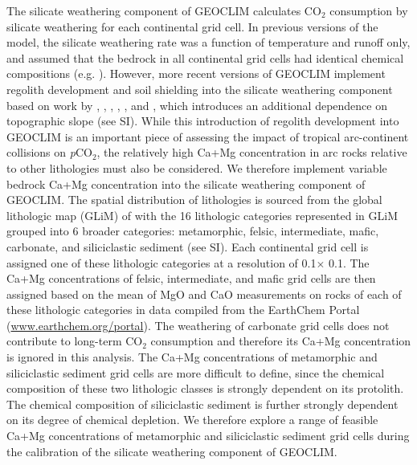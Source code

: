 \documentclass[11pt,letterpaper]{article}
\newcommand{\degrees}{\textdegree\xspace}
\newcommand{\pCOtwo}{\textit{p}CO$_{2}$\xspace}
\newcommand{\COtwo}{CO$_{2}$\xspace}
\begin{document}
The silicate weathering component of GEOCLIM calculates \COtwo consumption by silicate weathering for each continental grid cell. In previous versions of the model, the silicate weathering rate was a function of temperature and runoff only, and assumed that the bedrock in all continental grid cells had identical chemical compositions (e.g. \citealp{Godderis2014a}). However, more recent versions of GEOCLIM implement regolith development and soil shielding into the silicate weathering component based on work by \citet{Heimsath1997a}, \citet{Gabet2009a}, \citet{West2012a}, \citet{Carretier2014a}, \citet{Godderis2017b}, and \citet{Maffre2018a}, which introduces an additional dependence on topographic slope (see SI). While this introduction of regolith development into GEOCLIM is an important piece of assessing the impact of tropical arc-continent collisions on \pCOtwo, the relatively high Ca+Mg concentration in arc rocks relative to other lithologies must also be considered. We therefore implement variable bedrock Ca+Mg concentration into the silicate weathering component of GEOCLIM. The spatial distribution of lithologies is sourced from the global lithologic map (GLiM) of \citet{Hartmann2012a} with the 16 lithologic categories represented in GLiM grouped into 6 broader categories: metamorphic, felsic, intermediate, mafic, carbonate, and siliciclastic sediment (see SI). Each continental grid cell is assigned one of these lithologic categories at a resolution of 0.1\degrees $\times$ 0.1\degrees. The Ca+Mg concentrations of felsic, intermediate, and mafic grid cells are then assigned based on the mean of MgO and CaO measurements on rocks of each of these lithologic categories in data compiled from the EarthChem Portal (\url{www.earthchem.org/portal}). The weathering of carbonate grid cells does not contribute to long-term \COtwo consumption and therefore its Ca+Mg concentration is ignored in this analysis. The Ca+Mg concentrations of metamorphic and siliciclastic sediment grid cells are more difficult to define, since the chemical composition of these two lithologic classes is strongly dependent on its protolith. The chemical composition of siliciclastic sediment is further strongly dependent on its degree of chemical depletion. We therefore explore a range of feasible Ca+Mg concentrations of metamorphic and siliciclastic sediment grid cells during the calibration of the silicate weathering component of GEOCLIM.
\end{document}
